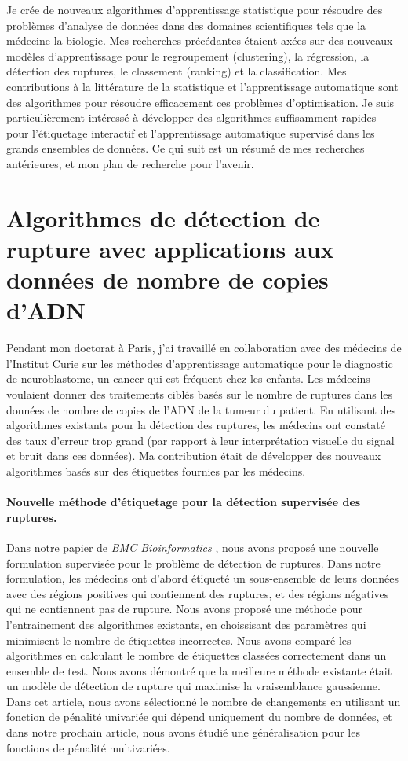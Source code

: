 Je crée de nouveaux algorithmes d'apprentissage statistique pour
résoudre des problèmes d'analyse de données dans des domaines
scientifiques tels que la médecine la biologie. Mes recherches
précédantes étaient axées sur des nouveaux modèles d'apprentissage
pour le regroupement (clustering), la régression, la détection des
ruptures, le classement (ranking) et la classification. Mes
contributions à la littérature de la statistique et l'apprentissage
automatique sont des algorithmes pour résoudre efficacement ces
problèmes d'optimisation. Je suis particulièrement intéressé à
développer des algorithmes suffisamment rapides pour l'étiquetage
interactif et l'apprentissage automatique supervisé dans les grands
ensembles de données. Ce qui suit est un résumé de mes recherches
antérieures, et mon plan de recherche pour l'avenir.

\section{Algorithmes de détection de rupture avec applications aux données de nombre de copies d'ADN}

Pendant mon doctorat à Paris, j'ai travaillé en collaboration avec des
médecins de l'Institut Curie sur les méthodes d'apprentissage
automatique pour le diagnostic de neuroblastome, un cancer qui est
fréquent chez les enfants. Les médecins voulaient donner des
traitements ciblés basés sur le nombre de ruptures dans les données de
nombre de copies de l'ADN de la tumeur du patient. En utilisant des
algorithmes existants pour la détection des ruptures, les médecins ont
constaté des taux d'erreur trop grand (par rapport à leur
interprétation visuelle du signal et bruit dans ces données). Ma
contribution était de développer des nouveaux algorithmes basés sur
des étiquettes fournies par les médecins.

\paragraph{Nouvelle méthode d'étiquetage pour la détection supervisée des ruptures.}

Dans notre papier de \emph{BMC Bioinformatics}
\citep{HOCKING-breakpoints}, nous avons proposé une nouvelle
formulation supervisée pour le problème de détection de ruptures. Dans
notre formulation, les médecins ont d'abord étiqueté un sous-ensemble
de leurs données avec des régions positives qui contiennent des
ruptures, et des régions négatives qui ne contiennent pas de rupture.
Nous avons proposé une méthode pour l'entrainement des algorithmes
existants, en choissisant des paramètres qui minimisent le nombre de
étiquettes incorrectes. Nous avons comparé les algorithmes en
calculant le nombre de étiquettes classées correctement dans un
ensemble de test. Nous avons démontré que la meilleure méthode
existante était un modèle de détection de rupture qui maximise la
vraisemblance gaussienne.  Dans cet article, nous avons sélectionné le
nombre de changements en utilisant un fonction de pénalité univariée
qui dépend uniquement du nombre de données, et dans notre prochain
article, nous avons étudié une généralisation pour les fonctions de
pénalité multivariées.


